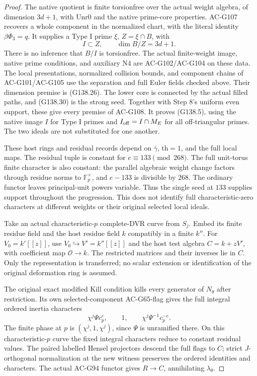 \begin{proof}
The native quotient is finite torsionfree over the actual
weight algebra, of dimension \(3d+1\), with
\(\mathrm{Unr0}\) and the native prime-core properties.
AC-G107 recovers a whole component in the normalized
chart, with the literal identity \(\beta\Phi_3=q\).
It supplies a Type I prime \(\xi\), \(Z=\xi\cap B\), with
\[
                    I\subset Z,\qquad\dim B/Z=3d+1.
 \tag{G138.30}
\]
There is no inference that \(B/I\) is torsionfree.
The actual finite-weight image, native prime conditions,
and auxiliary \(\mathrm{N4}\) are AC-G102/AC-G104 on
these data.  The local presentations, normalized collision
bounds, and component chains of AC-G101/AC-G105 use
the separation and full Euler fields checked above.
Their dimension premise is (G138.26).  The lower core
is connected by the actual filled paths, and (G138.30)
is the strong seed.  Together with Step 8's uniform
even support, these give every premise of AC-G108.
It proves (G138.5), using the native image \(I\) for
Type I primes and \(I_{\rm off}=I\cap M_E\) for all
off-triangular primes.  The two ideals are not substituted
for one another.

These host rings and residual records depend on
\(\bar\gamma\), \(\mathrm{th}=1\), and the full local maps.
The residual tuple is constant for
\(e\equiv133\pmod{268}\).
The full unit-torus finite character is also constant:
the parallel algebraic weight change factors through
residue norms to \(\mathbb F_p^\times\), and \(e-133\)
is divisible by \(268\).
The ordinary functor leaves principal-unit powers
variable.  Thus the single seed at \(133\) supplies
support throughout the progression.  This does not
identify full characteristic-zero characters at different
weights or their original selected local ideals.

Take an actual characteristic-\(p\) complete-DVR curve
from \(S_j\).  Embed its finite residue field and the
host residue field \(k\) compatibly in a finite \(k''\).
For \(V_0=k'[[z]]\), use
\(V_0\hookrightarrow V'=k''[[z]]\) and the host test
algebra \(C=k+zV'\), with coefficient map
\(\mathcal O\to k\).
The restricted matrices and their inverses lie in \(C\).
Only the representation is transferred; no scalar
extension or identification of the original deformation
ring is assumed.

The original exact modified Kill condition kills every
generator of \(N_\theta\) after restriction.
Its own selected-component AC-G65-flag gives the full
integral ordered inertia characters
\[
       \chi^j\Psi c_p^e,\qquad1,\qquad
                     \chi^j\Psi^{-1}c_p^{-e}.
 \tag{G138.31}
\]
The finite phase at \(p\) is \((\chi^j,1,\chi^j)\),
since \(\Psi\) is unramified there.
On this characteristic-\(p\) curve the fixed integral
characters reduce to constant residual values.
The paired labelled Hensel projectors descend the full
flags to \(C\); strict \(J\)-orthogonal normalization at
the new witness preserves the ordered identities and
characters.  The actual AC-G94 functor gives \(R\to C\),
annihilating \(\lambda_\theta\).


\end{proof}
